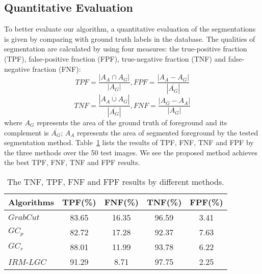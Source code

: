 \subsection{Quantitative Evaluation} \label{IGC:experiment:QE}
To better evaluate our algorithm, a quantitative evaluation of the segmentations is given by comparing with ground truth labels in the database. The qualities of segmentation are calculated by using four measures: the true-positive fraction (TPF), false-positive fraction (FPF), true-negative fraction (TNF) and false-negative fraction (FNF):
        \begin{displaymath}
        TPF=\frac{|A_A\cap A_G|}{|A_G|},FPF=\frac{|A_A-A_G|}{|\overline{A_G}|}
        \end{displaymath}
        \begin{displaymath}
        TNF=\frac{|\overline{A_A\cup A_G}|}{|\overline{A_G}|},
        FNF=\frac{|A_G-A_A|}{|A_G|}
        \end{displaymath}
        where $A_G$ represents the area of the ground truth of foreground
        and its complement is $\overline{A_G}$; $A_A$ represents the area of
        segmented foreground by the tested segmentation method.
        Table~\ref{IGC:tab:measures} lists the results of TPF,  FNF, TNF and FPF  by the three methods over the 50 test images. We see the proposed method achieves the best TPF, FNF, TNF and FPF results.

        \begin{table}
         \caption{The TNF, TPF, FNF and FPF results by different methods.}\label{IGC:tab:measures}
        \begin{center}
        \begin{tabular}{|l|c|c|c|c|}
        \hline
        Algorithms & TPF(\%) & FNF(\%) & TNF(\%)& FPF(\%)  \\
        \hline\hline
        $GrabCut$ & 83.65 &16.35&96.59&3.41 \\
        $GC_p$ & 82.72 & 17.28  & 92.37 & 7.63\\
        $GC_r$ &88.01&11.99&93.78&6.22\\
        $IRM$-$LGC$ &91.29&8.71 & 97.75&2.25\\
        \hline
        \end{tabular}
        \end{center}
        \end{table}

